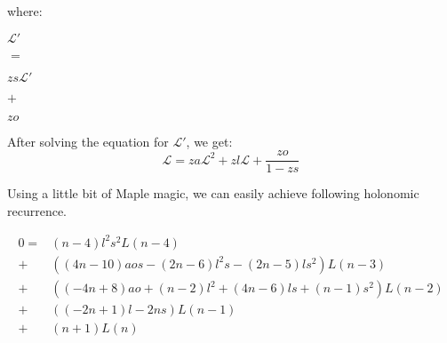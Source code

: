 \documentclass[final]{article}
\theoremstyle{definition}
\theoremstyle{remark}
\newcommand{\gf}[1]{\ensuremath{\mathcal{#1}}}
\begin{document}
where:

\begin{center}
    \begin{minipage}[t]{.2\textwidth}
        \begin{center}
            \(\gf{L'}\)\\
        \end{center}
    \end{minipage}%
    \begin{minipage}[t]{.05\textwidth}
        \begin{center}
            \(=\)\\
        \end{center}
    \end{minipage}%
    \begin{minipage}[t]{.2\textwidth}
        \begin{center}
            \(z s \gf{L'}\)\\
        \end{center}
    \end{minipage}%
    \begin{minipage}[t]{.05\textwidth}
        \begin{center}
            \(+\)\\
        \end{center}
    \end{minipage}%
    \begin{minipage}[t]{.2\textwidth}
        \begin{center}
            \(z o\)\\
        \end{center}
    \end{minipage}%
\end{center}

After solving the equation for \(\gf{L'}\), we get:
\[\gf{L} = z a \gf{L}^2 + z l \gf{L} + \frac{z o}{1 - z s}\]

Using a little bit of Maple magic, we can easily achieve following holonomic recurrence.

\[\begin{array}{rl}
        0 =& (n - 4) l^2 s^2 L(n - 4)\\
        +& ((4 n - 10) a o s - (2 n - 6) l^2 s - (2 n - 5) l s^2) L(n - 3)\\
        +& ((-4 n + 8) a o + (n - 2) l^2 + (4 n - 6) l s + (n - 1) s^2) L(n - 2)\\
        +& ((-2 n + 1) l - 2 n s) L(n - 1)\\
        +& (n + 1) L(n)
\end{array}\]
\end{document}

